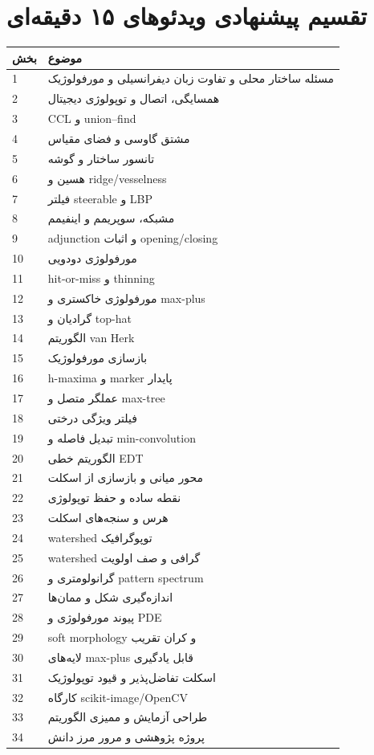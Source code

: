 \documentclass[12pt,openany,oneside]{book}
\begin{document}
\section{تقسیم پیشنهادی ویدئوهای ۱۵ دقیقه‌ای}
\begin{longtable}{p{12mm}p{115mm}}
\toprule
بخش & موضوع \\
\midrule
1 & مسئله ساختار محلی و تفاوت زبان دیفرانسیلی و مورفولوژیک \\
2 & همسایگی، اتصال و توپولوژی دیجیتال \\
3 & CCL و union--find \\
4 & مشتق گاوسی و فضای مقیاس \\
5 & تانسور ساختار و گوشه \\
6 & هسین و ridge/vesselness \\
7 & فیلتر steerable و LBP \\
8 & مشبکه، سوپریمم و اینفیمم \\
9 & adjunction و اثبات opening/closing \\
10 & مورفولوژی دودویی \\
11 & hit-or-miss و thinning \\
12 & مورفولوژی خاکستری و max-plus \\
13 & گرادیان و top-hat \\
14 & الگوریتم van Herk \\
15 & بازسازی مورفولوژیک \\
16 & h-maxima و marker پایدار \\
17 & عملگر متصل و max-tree \\
18 & فیلتر ویژگی درختی \\
19 & تبدیل فاصله و min-convolution \\
20 & الگوریتم خطی EDT \\
21 & محور میانی و بازسازی از اسکلت \\
22 & نقطه ساده و حفظ توپولوژی \\
23 & هرس و سنجه‌های اسکلت \\
24 & watershed توپوگرافیک \\
25 & watershed گرافی و صف اولویت \\
26 & گرانولومتری و pattern spectrum \\
27 & اندازه‌گیری شکل و ممان‌ها \\
28 & پیوند مورفولوژی و PDE \\
29 & soft morphology و کران تقریب \\
30 & لایه‌های max-plus قابل یادگیری \\
31 & اسکلت تفاضل‌پذیر و قیود توپولوژیک \\
32 & کارگاه scikit-image/OpenCV \\
33 & طراحی آزمایش و ممیزی الگوریتم \\
34 & پروژه پژوهشی و مرور مرز دانش \\
\bottomrule
\end{longtable}
\end{document}
